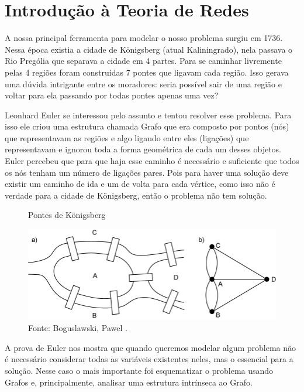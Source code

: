 \chapter{Introdução à Teoria de Redes}

A nossa principal ferramenta para modelar o nosso problema surgiu em 1736. Nessa época existia a cidade de Königsberg (atual Kaliningrado), nela passava o Rio Prególia que separava a cidade em 4 partes. Para se caminhar livremente pelas 4 regiões foram construídas 7 pontes que ligavam cada região. Isso gerava uma dúvida intrigante entre os moradores: seria possível sair de uma região e voltar para ela passando por todas pontes apenas uma vez?

Leonhard Euler \cite{Euler1736} se interessou pelo assunto e tentou resolver esse problema. Para isso ele criou uma estrutura chamada Grafo que era composto por pontos (nós) que representavam as regiões e algo ligando entre eles (ligações) que representavam e ignorou toda a forma geométrica de cada um desses objetos. Euler percebeu que para que haja esse caminho é necessário e suficiente que todos os nós tenham um número de ligações pares. Pois para haver uma solução deve existir um caminho de ida e um  de volta para cada vértice, como isso não é verdade para a cidade de Königsberg, então o problema não tem solução.

\begin{figure}[H]
  \centering
  \captionsetup{font=normalsize,skip=1pt,singlelinecheck=on,labelsep=endash}
  \caption{Pontes de Königsberg}
  \includegraphics[scale=0.5]{./img/Koenigsberg.png}
  \captionsetup{font=small,position=below,skip=-1pt}
   \caption*{Fonte: Boguslawski, Pawel \cite{Koenigsberg}.}
   \label{Konigsberg}
\end{figure}

A prova de Euler nos mostra que quando queremos modelar algum problema não é necessário considerar todas as variáveis existentes neles, mas o essencial para a solução. Nesse caso o mais importante foi esquematizar o problema usando Grafos e, principalmente, analisar uma estrutura intrínseca ao Grafo.

